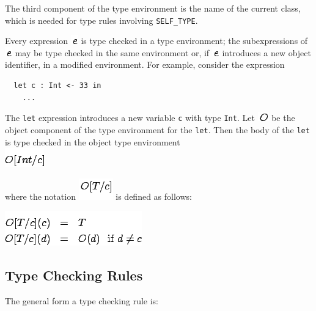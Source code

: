 \documentclass[]{article}
\begin{document}
The third component of the type environment is the name of the current
class, which is needed for type rules involving \texttt{SELF\_TYPE}.

Every expression \includegraphics{img51.png} is type checked in a type
environment; the subexpressions of \includegraphics{img51.png} may be
type checked in the same environment or, if \includegraphics{img51.png}
introduces a new object identifier, in a modified environment. For
example, consider the expression

\begin{verbatim}
  let c : Int <- 33 in
    ...
\end{verbatim}

The \texttt{let} expression introduces a new variable \texttt{c} with
type \texttt{Int}. Let \includegraphics{img56.png} be the object
component of the type environment for the \texttt{let}. Then the body of
the \texttt{let} is type checked in the object type environment \\

\includegraphics{img66.png}

where the notation \includegraphics{img67.png} is defined as follows:

\includegraphics{img68.png}

\subsection{Type Checking Rules}

The general form a type checking rule is: \\
\end{document}
